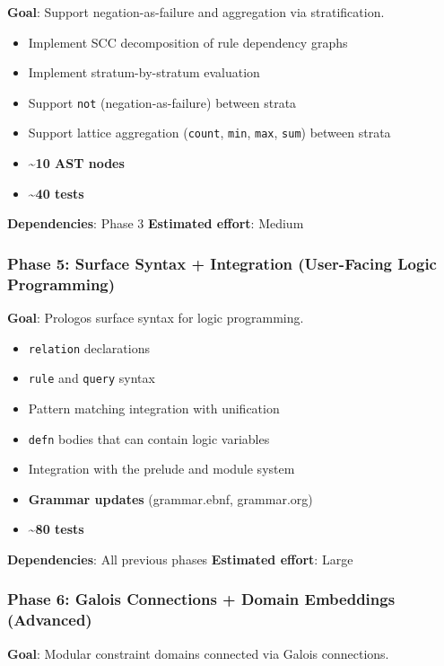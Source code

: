 \documentclass[11pt]{article}
\begin{document}
\textbf{Goal}: Support negation-as-failure and aggregation via stratification.

\begin{itemize}
\item Implement SCC decomposition of rule dependency graphs
\item Implement stratum-by-stratum evaluation
\item Support \texttt{not} (negation-as-failure) between strata
\item Support lattice aggregation (\texttt{count}, \texttt{min}, \texttt{max}, \texttt{sum}) between strata
\item \textbf{\textasciitilde{}10 AST nodes}
\item \textbf{\textasciitilde{}40 tests}
\end{itemize}

\textbf{Dependencies}: Phase 3
\textbf{Estimated effort}: Medium
\subsubsection{Phase 5: Surface Syntax + Integration (User-Facing Logic Programming)}
\label{sec:org2032bc7}

\textbf{Goal}: Prologos surface syntax for logic programming.

\begin{itemize}
\item \texttt{relation} declarations
\item \texttt{rule} and \texttt{query} syntax
\item Pattern matching integration with unification
\item \texttt{defn} bodies that can contain logic variables
\item Integration with the prelude and module system
\item \textbf{Grammar updates} (grammar.ebnf, grammar.org)
\item \textbf{\textasciitilde{}80 tests}
\end{itemize}

\textbf{Dependencies}: All previous phases
\textbf{Estimated effort}: Large
\subsubsection{Phase 6: Galois Connections + Domain Embeddings (Advanced)}
\label{sec:orgcbc91ce}

\textbf{Goal}: Modular constraint domains connected via Galois connections.
\end{document}
